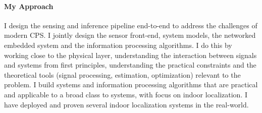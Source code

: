 \documentclass[10pt]{article}
\begin{document}
\paragraph{My Approach}
I design the sensing and inference pipeline end-to-end to address the challenges of modern CPS. I jointly design the sensor front-end, system models, the networked embedded system and the information processing algorithms. I do this by working close to the physical layer, understanding the interaction between signals and systems from first principles, understanding the practical constraints and the theoretical tools (signal processing, estimation, optimization) relevant to the problem. 
I build systems and information processing algorithms that are practical and applicable to a broad class to systems, with focus on indoor localization. I have deployed and proven several indoor localization systems in the real-world.

\end{document}
